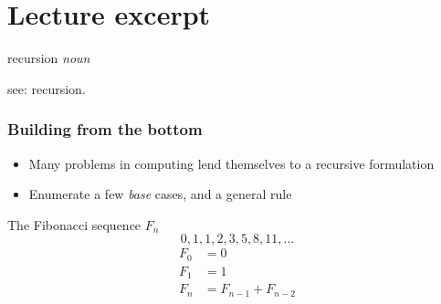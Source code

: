 \documentclass[presentation]{beamer}
\begin{document}

\section{Lecture excerpt}

\begin{frame}
  \begin{definition}
    recursion \emph{noun}

    see: recursion.
  \end{definition}
\end{frame}

\begin{frame}
  \frametitle{Building from the bottom}
  \begin{itemize}
  \item Many problems in computing lend themselves to a recursive
    formulation
  \item Enumerate a few \emph{base} cases, and a general rule
  \end{itemize}

  \begin{exampleblock}{The Fibonacci sequence $F_n$}
    \begin{equation*}
      0, 1, 1, 2, 3, 5, 8, 11, \dots
    \end{equation*}
    \begin{align*}
      F_0 &= 0\\
      F_1 &= 1\\
      F_n &= F_{n-1} + F_{n-2}
    \end{align*}
  \end{exampleblock}
\end{frame}
\end{document}

